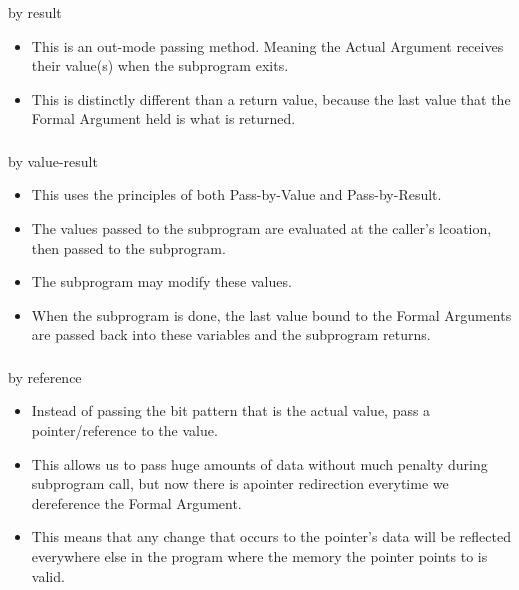 \subsubsection{}
by result

\begin{itemize}[noitemsep]
\item This is an out-mode passing method. Meaning the Actual Argument receives their value(s) when the subprogram exits.
\item This is distinctly different than a return value, because the last value that the Formal Argument held is what is returned.
\end{itemize}

\subsubsection{}
by value-result

\begin{itemize}[noitemsep]
\item This uses the principles of both Pass-by-Value and Pass-by-Result.
\item The values passed to the subprogram are evaluated at the caller's lcoation, then passed to the subprogram.
\item The subprogram may modify these values.
\item When the subprogram is done, the last value bound to the Formal Arguments are passed back into these variables and the subprogram returns.
\end{itemize}

\subsubsection{}
by reference

\begin{itemize}[noitemsep]
\item Instead of passing the bit pattern that is the actual value, pass a pointer/reference to the value.
\item This allows us to pass huge amounts of data without much penalty during subprogram call, but now there is apointer redirection everytime we dereference the Formal Argument.
\item This means that any change that occurs to the pointer's data will be reflected everywhere else in the program where the memory the pointer points to is valid.
\end{itemize}

